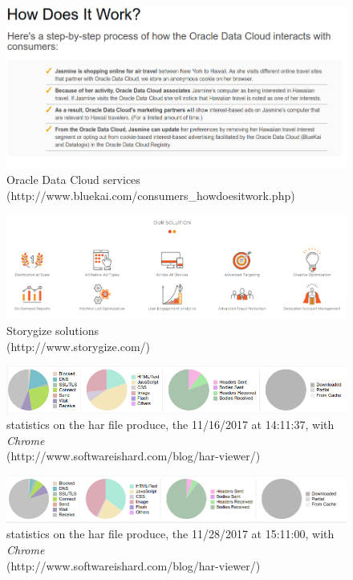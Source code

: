\documentclass[conference]{IEEEtran}
\begin{document}
\begin{figure}
\caption{Oracle Data Cloud services \\ (http://www.bluekai.com/consumers\_howdoesitwork.php)}
\includegraphics[width=\linewidth]{Oracle.png}
\end{figure}


\begin{figure}
\caption{Storygize solutions \\ (http://www.storygize.com/)}
\includegraphics[width=\linewidth]{storygize.png}
\end{figure}

\begin{figure}
\caption{statistics on the har file produce, the 11/16/2017 at 14:11:37, with \textit{Chrome} \\ (http://www.softwareishard.com/blog/har-viewer/)}
\includegraphics[width=\linewidth]{diags.png}
\end{figure}

\begin{figure}
\caption{statistics on the har file produce, the 11/28/2017 at 15:11:00, with \textit{Chrome} \\ (http://www.softwareishard.com/blog/har-viewer/)}
\includegraphics[width=\linewidth]{diags2.png}
\end{figure}
\end{document}
